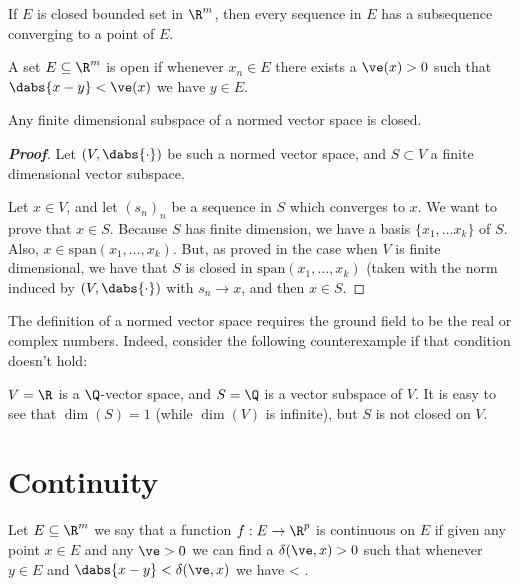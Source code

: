 \begin{theorem}\label{thm:closed_set_subsequence_metop}
If $E$ is closed bounded set in $\R^m$, then every sequence in $E$ has a subsequence converging to a point of $E$.
\end{theorem}

\begin{definition}\label{def:open_set_met_top}
A set $E \subseteq \R^m$ is open if whenever $x_n \in E$ there exists a $\ve(x)>0$ such that $\dabs{x-y}<\ve(x)$ we have $y \in E$.
\end{definition}

\begin{theorem} Any finite dimensional subspace of a normed vector space is closed.
\end{theorem}
\begin{proof}[{\bf Proof}] Let $(V,\dabs{\cdot})$ be such a normed vector space, and $S\subset V$ a finite dimensional vector subspace.

Let $x\in V$, and let $(s_n)_n$ be a sequence in $S$ which converges to $x$. We want to prove that $x\in S$. Because $S$ has finite dimension, we have a basis $\{x_1,\dots x_k\}$ of $S$. Also, $x \in \text{span}(x_1,\dots, x_k)$. But, as proved in the case when $V$ is finite dimensional, we have that $S$ is closed in $\text{span}(x_1,\dots,x_k)$ (taken with the norm induced by $(V,\dabs{\cdot})$ with $s_n \to x$, and then $x\in S$.
\end{proof}

\begin{note}
The definition of a normed vector space requires the ground field to be the real or complex numbers. Indeed, consider the following counterexample if that condition doesn't hold:

$V=\R$ is a $\Q$-vector space, and $S=\Q$ is a vector subspace of $V$. It is easy to see that $\dim(S)=1$ (while $\dim(V)$ is infinite), but $S$ is not closed on $V$.
\end{note}


\section{Continuity}

\begin{definition}\label{def:continous_rn}
Let $E\subseteq \R^m$ we say that a function $f:E\to \R^p$ is continuous on $E$ if given any point $x \in E$ and any $\ve>0$ we can find a $\delta(\ve,x)>0$ such that whenever $y\in E$ and $\dabs{x-y} < \delta(\ve,x)$ we have
\be
{} < \ve.
\ee
\end{definition}

